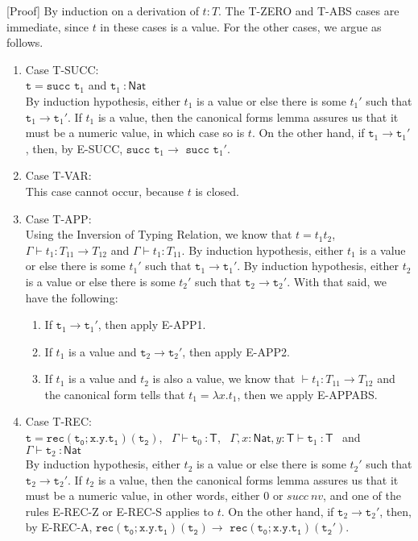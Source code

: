 \documentclass[a4paper]{article}
\begin{document}
{[Proof]} By induction on a derivation of $t:T$. The T-ZERO and T-ABS cases are immediate, since $t$ in these cases is a value. For the other cases, we argue as follows.
\begin{enumerate}
\item Case T-SUCC:\\
$\mathtt {t = succ}$ $\mathtt t_1$ and $\mathtt t_1 ~\mathsf {: Nat}$\\
By induction hypothesis, either $t_1$ is a value or else there is some $t_1'$ such that $\mathtt t_1 \rightarrow \mathtt t_1'$. If $t_1$ is a value, then the canonical forms lemma assures us that it must be a numeric value, in which case so is $t$. On the other hand, if $\mathtt t_1 \rightarrow \mathtt t_1'$, then, by E-SUCC, $\mathtt {succ}$ $\mathtt t_1 \rightarrow$ $\mathtt {succ}$ $\mathtt t_1'$.
\item Case T-VAR:\\
This case cannot occur, because $t$ is closed.
\item Case T-APP:\\
Using the Inversion of Typing Relation, we know that $t = t_1 t_2$, $\Gamma\vdash t_1 : T_{11} \rightarrow T_{12}$ and $\Gamma\vdash t_1 : T_{11}$. By induction hypothesis, either $t_1$ is a value or else there is some $t_1'$ such that $\mathtt t_1 \rightarrow \mathtt t_1'$. By induction hypothesis, either $t_2$ is a value or else there is some $t_2'$ such that $\mathtt t_2 \rightarrow \mathtt t_2'$. With that said, we have the following:
\begin{enumerate}
\item If $\mathtt t_1 \rightarrow \mathtt t_1'$, then apply E-APP1.
\item If $t_1$ is a value and $\mathtt t_2 \rightarrow \mathtt t_2'$, then apply E-APP2.
\item If $t_1$ is a value and $t_2$ is also a value, we know that $\vdash t_1 : T_{11} \rightarrow T_{12}$ and the canonical form tells that $t_1 = \lambda x.t_1$, then we apply E-APPABS.
\end{enumerate}
\item Case T-REC:\\
$\mathtt {t = rec(t_0;x.y.t_1)(t_2)}$, \ $\Gamma\vdash \mathtt t_0 ~\mathsf {: T}$, \ $\Gamma, x\mathsf{:Nat}, y\mathsf{:T}\vdash \mathtt t_1 ~\mathsf {: T}$ \ and \ $\Gamma\vdash \mathtt t_2 ~\mathsf {: Nat}$\\
By induction hypothesis, either $t_2$ is a value or else there is some $t_2'$ such that $\mathtt t_2 \rightarrow \mathtt t_2'$. If $t_2$ is a value, then the canonical forms lemma assures us that it must be a numeric value, in other words, either 0 or $succ \ nv$, and one of the rules E-REC-Z or E-REC-S applies to $t$. On the other hand, if $\mathtt t_2 \rightarrow \mathtt t_2'$, then, by E-REC-A, $\mathtt {rec(t_0;x.y.t_1)(t_2)} \rightarrow$ $\mathtt {rec(t_0;x.y.t_1)(t_2')}$.
\end{enumerate}
\end{document}
